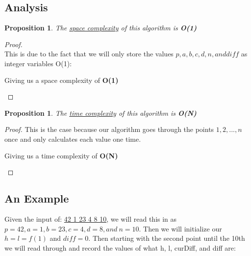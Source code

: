 \documentclass[12pt]{article}
\newtheorem{proposition}[theorem]{Proposition}
\begin{document}
\subsection{Analysis}

\begin{proposition}
\label{numq}
The \underline{space complexity} of this algorithm is \textbf{O(1)}
\end{proposition}

\begin{proof}
~ \\ \indent This is due to the fact that we will only store the values $p, a, b, c, d, n, and diff$
as integer variables O(1):
\begin{center}
    Giving us a space complexity of \textbf{O(1)}
\end{center}
\end{proof}

\begin{proposition}
\label{numq}
The \underline{time complexity} of this algorithm is \textbf{O(N)}
\end{proposition}

\begin{proof}
This is the case because our algorithm goes through the points $1, 2, ..., n$ once and only
calculates each value one time.
\begin{center}
    Giving us a time complexity of \textbf{O(N)}
\end{center}
\end{proof}


\subsection{An Example}
Given the input of: \underline{42 1 23 4 8 10}, we will read this in as
$p = 42, a = 1, b = 23, c = 4, d = 8, and\ n = 10$. Then we will initialize our $h = l = f(1)$ and $diff = 0$.
Then starting with the second point until the 10th we will read through and record the values of what h, l, curDiff,
and diff are:
\end{document}
